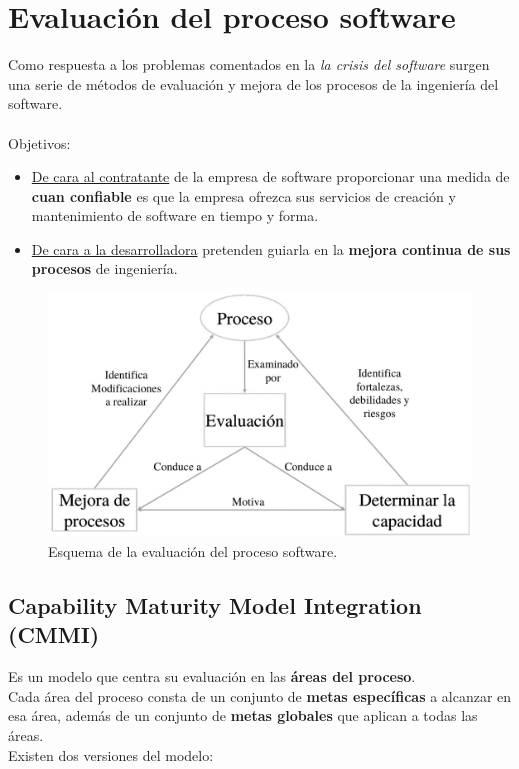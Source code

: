 \section{Evaluación del proceso software}
Como respuesta a los problemas comentados en la \textit{la crisis del software} surgen una serie de métodos de evaluación y mejora de los procesos de la ingeniería del software.
\\\\
Objetivos:
\begin{itemize}
    \item \uline{De cara al contratante} de la empresa de software proporcionar una medida de \textbf{cuan confiable} es que la empresa ofrezca sus servicios de creación y mantenimiento de software en tiempo y forma.
    \item \uline{De cara a la desarrolladora} pretenden guiarla en la \textbf{mejora continua de sus procesos} de ingeniería.
\end{itemize}

\begin{figure}[H]
    \centering
    \includegraphics[width=0.7\linewidth]{Resources/evaluacionSoftware}
    \caption{Esquema de la evaluación del proceso software.}
    \label{fig:evaluacionSoftware}
\end{figure}

\subsection{Capability Maturity Model Integration (CMMI)}
Es un modelo que centra su evaluación en las \textbf{áreas del proceso}.\\
Cada área del proceso consta de un conjunto de \textbf{metas específicas} a alcanzar en esa área, además de un conjunto de \textbf{metas globales} que aplican a todas las áreas.\\
Existen dos versiones del modelo:

